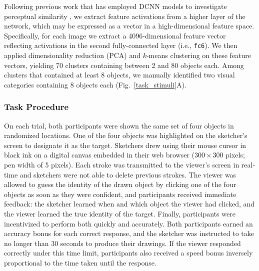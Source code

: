 \documentclass[10pt,letterpaper]{article}
\begin{document}
Following previous work that has employed DCNN models to investigate perceptual similarity \cite{FanCommon2018,peterson2018evaluating,kubilius2016deep}, we extract feature activations from a higher layer of the network, which may be expressed as a vector in a high-dimensional feature space.
Specifically, for each image we extract a 4096-dimensional feature vector reflecting activations in the second fully-connected layer (i.e., \texttt{fc6}).
We then applied dimensionality reduction (PCA) and $k$-means clustering on these feature vectors, yielding 70 clusters containing between 2 and 80 objects each.
Among clusters that contained at least 8 objects, we manually identified two visual categories containing 8 objects each (Fig.~\ref{task_stimuli}A).

\subsubsection{Task Procedure}

On each trial, both participants were shown the same set of four objects in randomized locations.
One of the four objects was highlighted on the sketcher's screen to designate it as the target.
Sketchers drew using their mouse cursor in black ink on a digital canvas embedded in their web browser ($300 \times 300$ pixels; pen width of 5 pixels).
Each stroke was transmitted to the viewer's screen in real-time and sketchers were not able to delete previous strokes.
The viewer was allowed to guess the identity of the drawn object by clicking one of the four objects as soon as they were confident, and participants received immediate feedback: the sketcher learned when and which object the viewer had clicked, and the viewer learned the true identity of the target.
Finally, participants were incentivized to perform both quickly and accurately.
Both participants earned an accuracy bonus for each correct response, and the sketcher was instructed to take no longer than 30 seconds to produce their drawings.
If the viewer responded correctly under this time limit, participants also received a speed bonus inversely proportional to the time taken until the response.
\end{document}
